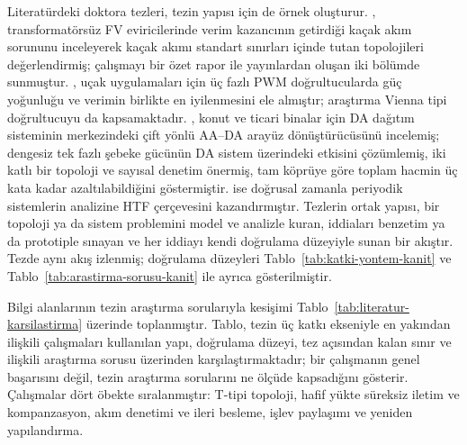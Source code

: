 Literatürdeki doktora tezleri, tezin yapısı için de örnek oluşturur. \citet{Kerekes2009}, transformatörsüz FV eviricilerinde verim kazancının getirdiği kaçak akım sorununu inceleyerek kaçak akımı standart sınırları içinde tutan topolojileri değerlendirmiş; çalışmayı bir özet rapor ile yayınlardan oluşan iki bölümde sunmuştur. \citet{Hartmann2011}, uçak uygulamaları için üç fazlı PWM doğrultucularda güç yoğunluğu ve verimin birlikte en iyilenmesini ele almıştır; araştırma Vienna tipi doğrultucuyu da kapsamaktadır. \citet{Dong2012}, konut ve ticari binalar için DA dağıtım sisteminin merkezindeki çift yönlü AA--DA arayüz dönüştürücüsünü incelemiş; dengesiz tek fazlı şebeke gücünün DA sistem üzerindeki etkisini çözümlemiş, iki katlı bir topoloji ve sayısal denetim önermiş, tam köprüye göre toplam hacmin üç kata kadar azaltılabildiğini göstermiştir. \citet{Wereley1991} ise doğrusal zamanla periyodik sistemlerin analizine HTF çerçevesini kazandırmıştır. Tezlerin ortak yapısı, bir topoloji ya da sistem problemini model ve analizle kuran, iddiaları benzetim ya da prototiple sınayan ve her iddiayı kendi doğrulama düzeyiyle sunan bir akıştır. Tezde aynı akış izlenmiş; doğrulama düzeyleri Tablo~\ref{tab:katki-yontem-kanit} ve Tablo~\ref{tab:arastirma-sorusu-kanit} ile ayrıca gösterilmiştir.

Bilgi alanlarının tezin araştırma sorularıyla kesişimi Tablo~\ref{tab:literatur-karsilastirma} üzerinde toplanmıştır. Tablo, tezin üç katkı ekseniyle en yakından ilişkili çalışmaları kullanılan yapı, doğrulama düzeyi, tez açısından kalan sınır ve ilişkili araştırma sorusu üzerinden karşılaştırmaktadır; bir çalışmanın genel başarısını değil, tezin araştırma sorularını ne ölçüde kapsadığını gösterir. Çalışmalar dört öbekte sıralanmıştır: T-tipi topoloji, hafif yükte süreksiz iletim ve kompanzasyon, akım denetimi ve ileri besleme, işlev paylaşımı ve yeniden yapılandırma.

